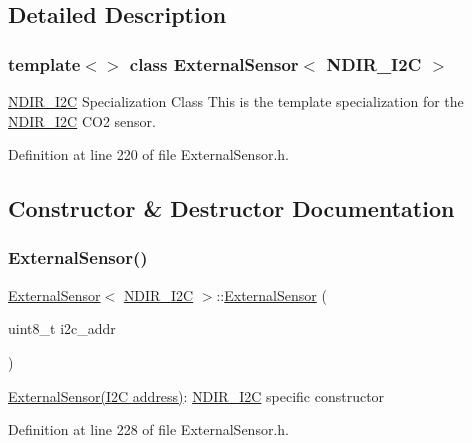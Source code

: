\subsection{Detailed Description}
\subsubsection*{template$<$$>$\newline
class External\+Sensor$<$ N\+D\+I\+R\+\_\+\+I2\+C $>$}

\hyperlink{class_n_d_i_r___i2_c}{N\+D\+I\+R\+\_\+\+I2C} Specialization Class This is the template specialization for the \hyperlink{class_n_d_i_r___i2_c}{N\+D\+I\+R\+\_\+\+I2C} C\+O2 sensor. 

Definition at line 220 of file External\+Sensor.\+h.



\subsection{Constructor \& Destructor Documentation}
\mbox{\label{class_external_sensor_3_01_n_d_i_r___i2_c_01_4_aa06970ea689679c0e1deb5360e05a0a4}} 
\subsubsection{\texorpdfstring{External\+Sensor()}{ExternalSensor()}}
{\footnotesize\ttfamily \hyperlink{class_external_sensor}{External\+Sensor}$<$ \hyperlink{class_n_d_i_r___i2_c}{N\+D\+I\+R\+\_\+\+I2C} $>$\+::\hyperlink{class_external_sensor}{External\+Sensor} (\begin{DoxyParamCaption}\item[{uint8\+\_\+t}]{i2c\+\_\+addr }\end{DoxyParamCaption})\hspace{0.3cm}{\ttfamily [inline]}}

\hyperlink{class_external_sensor}{External\+Sensor(\+I2\+C address)}\+: \hyperlink{class_n_d_i_r___i2_c}{N\+D\+I\+R\+\_\+\+I2C} specific constructor 

Definition at line 228 of file External\+Sensor.\+h.



